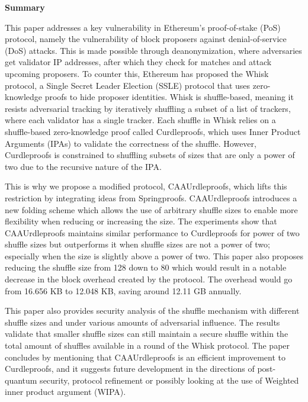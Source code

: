 \onecolumn     %
\thispagestyle{empty}

\begin{center}
    \begin{tcolorbox}[
        width=\dimexpr\paperwidth - 2in\relax,  %
        colback=white,                          %
        colframe=white,                         %
        left=60pt, right=60pt, top=10pt, bottom=10pt, %
        boxrule=0.8pt, %
        fontupper=\large
    ]
        \textbf{\large Summary}%

This paper addresses a key vulnerability in Ethereum’s proof-of-stake (PoS) protocol, namely the vulnerability of block proposers against denial-of-service (DoS) attacks.
This is made possible through deanonymization, where adversaries get validator IP addresses, after which they check for matches and attack upcoming proposers.
To counter this, Ethereum has proposed the Whisk protocol, a Single Secret Leader Election (SSLE) protocol that uses zero-knowledge proofs to hide proposer identities.
Whisk is shuffle-based, meaning it resists adversarial tracking by iteratively shuffling a subset of a list of trackers, where each validator has a single tracker.
Each shuffle in Whisk relies on a shuffle-based zero-knowledge proof called Curdleproofs, which uses Inner Product Arguments (IPAs) to validate the correctness of the shuffle.
However, Curdleproofs is constrained to shuffling subsets of sizes that are only a power of two due to the recursive nature of the IPA.


This is why we propose a modified protocol, CAAUrdleproofs, which lifts this restriction by integrating ideas from Springproofs.
CAAUrdleproofs introduces a new folding scheme which allows the use of arbitrary shuffle sizes to enable more flexibility when reducing or increasing the size.
The experiments show that CAAUrdleproofs maintains similar performance to Curdleproofs for power of two shuffle sizes but outperforms it when shuffle sizes are not a power of two; especially when the size is slightly above a power of two.
This paper also proposes reducing the shuffle size from 128 down to 80 which would result in a notable decrease in the block overhead created by the protocol.
The overhead would go from 16.656 KB to 12.048 KB, saving around 12.11 GB annually.


This paper also provides security analysis of the shuffle mechanism with different shuffle sizes and under various amounts of adversarial influence.
The results validate that smaller shuffle sizes can still maintain a secure shuffle within the total amount of shuffles available in a round of the Whisk protocol.
The paper concludes by mentioning that CAAUrdleproofs is an efficient improvement to Curdleproofs, and it suggests future development in the directions of post-quantum security, protocol refinement or possibly looking at the use of Weighted inner product argument (WIPA).



        \end{tcolorbox}
    \end{center}